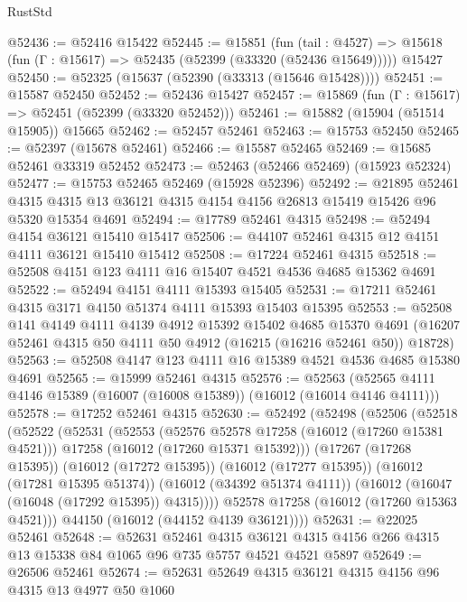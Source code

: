 \begin{lexlean}{RustStd}
\begin{coremodule}
@52436 := @52416 @15422
@52445 := @15851
    (fun (tail : @4527) => @15618 (fun (Γ : @15617) => @52435 (@52399 (@33320 (@52436 @15649)))))
    @15427
@52450 := @52325 (@15637 (@52390 (@33313 (@15646 @15428))))
@52451 := @15587 @52450
@52452 := @52436 @15427
@52457 := @15869 (fun (Γ : @15617) => @52451 (@52399 (@33320 @52452)))
@52461 := @15882 (@15904 (@51514 @15905)) @15665
@52462 := @52457 @52461
@52463 := @15753 @52450
@52465 := @52397 (@15678 @52461)
@52466 := @15587 @52465
@52469 := @15685 @52461 @33319 @52452
@52473 := @52463 (@52466 @52469) (@15923 @52324)
@52477 := @15753 @52465 @52469 (@15928 @52396)
@52492 := @21895
    @52461
    @4315
    @4315
    @13
    @36121
    @4315
    @4154
    @4156
    @26813
    @15419
    @15426
    @96
    @5320
    @15354
    @4691
@52494 := @17789 @52461 @4315
@52498 := @52494 @4154 @36121 @15410 @15417
@52506 := @44107 @52461 @4315 @12 @4151 @4111 @36121 @15410 @15412
@52508 := @17224 @52461 @4315
@52518 := @52508 @4151 @123 @4111 @16 @15407 @4521 @4536 @4685 @15362 @4691
@52522 := @52494 @4151 @4111 @15393 @15405
@52531 := @17211 @52461 @4315 @3171 @4150 @51374 @4111 @15393 @15403 @15395
@52553 := @52508
    @141
    @4149
    @4111
    @4139
    @4912
    @15392
    @15402
    @4685
    @15370
    @4691
    (@16207 @52461 @4315 @50 @4111 @50 @4912 (@16215 (@16216 @52461 @50)) @18728)
@52563 := @52508 @4147 @123 @4111 @16 @15389 @4521 @4536 @4685 @15380 @4691
@52565 := @15999 @52461 @4315
@52576 := @52563 (@52565 @4111 @4146 @15389 (@16007 (@16008 @15389)) (@16012 (@16014 @4146 @4111)))
@52578 := @17252 @52461 @4315
@52630 := @52492
    (@52498
      (@52506
        (@52518
          (@52522
            (@52531
              (@52553
                (@52576 @52578 @17258 (@16012 (@17260 @15381 @4521)))
                @17258
                (@16012 (@17260 @15371 @15392)))
              (@17267 (@17268 @15395))
              (@16012 (@17272 @15395))
              (@16012 (@17277 @15395))
              (@16012 (@17281 @15395 @51374))
              (@16012 (@34392 @51374 @4111))
              (@16012 (@16047 (@16048 (@17292 @15395)) @4315))))
          @52578
          @17258
          (@16012 (@17260 @15363 @4521)))
        @44150
        (@16012 (@44152 @4139 @36121))))
@52631 := @22025 @52461
@52648 := @52631
    @52461
    @4315
    @36121
    @4315
    @4156
    @266
    @4315
    @13
    @15338
    @84
    @1065
    @96
    @735
    @5757
    @4521
    @4521
    @5897
@52649 := @26506 @52461
@52674 := @52631
    @52649
    @4315
    @36121
    @4315
    @4156
    @96
    @4315
    @13
    @4977
    @50
    @1060

\end{coremodule}
\end{lexlean}
